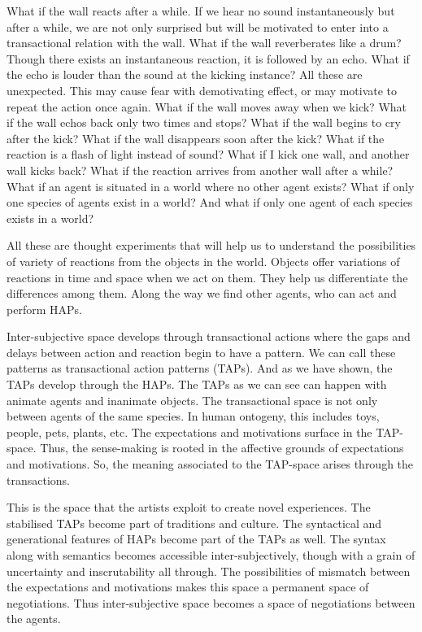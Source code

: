 What if the wall reacts after a while. If we hear no sound instantaneously but after a while, we are not only surprised but will be motivated to enter into a transactional relation with the wall. What if the wall reverberates like a drum? Though there exists an instantaneous reaction, it is followed by an echo.  What if the echo is louder than the sound at the kicking instance? All these are unexpected. This may cause fear with demotivating effect, or may motivate to repeat the action once again. What if the wall moves away when we kick? What if the wall echos back only two times and stops? What if the wall begins to cry after the kick? What if the wall disappears soon after the kick? What if the reaction is a flash of light instead of sound? What if I kick one wall, and another wall kicks back? What if the reaction arrives from another wall after a while? What if an agent is situated in a world where no other agent exists? What if only one species of agents exist in a world? And what if only one agent of each species exists in a world? 

All these are thought experiments that will help us to understand the possibilities of variety of reactions from the objects in the world. Objects offer variations of reactions in time and space when we act on them. They help us differentiate the differences among them. Along the way we find other agents, who can act and perform HAPs.

Inter-subjective space develops through transactional actions where the gaps and delays between action and reaction begin to have a pattern. We can call these patterns as transactional action patterns (TAPs). And as we have shown, the TAPs develop through the HAPs. The TAPs as we can see can happen with animate agents and inanimate objects. The transactional space is not only between agents of the same species. In human ontogeny, this includes toys, people, pets, plants, etc. The expectations and motivations surface in the TAP-space. Thus, the sense-making is rooted in the affective grounds of expectations and motivations. So, the meaning associated to the TAP-space arises through the transactions.

This is the space that the artists exploit to create novel experiences. The stabilised TAPs become part of traditions and culture. The syntactical and generational features of HAPs become part of the TAPs as well. The syntax along with semantics becomes accessible inter-subjectively, though with a grain of uncertainty and inscrutability all through. The possibilities of mismatch between the expectations and motivations makes this space a permanent space of negotiations. Thus inter-subjective space becomes a space of negotiations between the agents.

